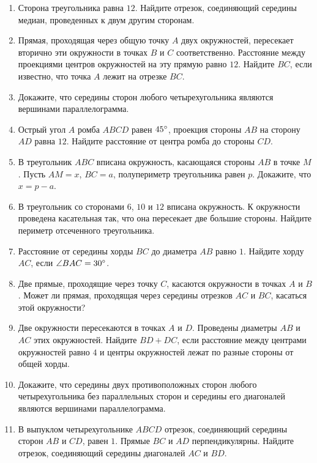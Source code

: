 \documentclass[12pt, a4paper]{article}
\begin{document}
  
\cfoot{}
\begin{enumerate}
	\item Сторона треугольника равна $12$. Найдите отрезок, соединяющий середины медиан, проведенных к двум другим сторонам.
	\item Прямая, проходящая через общую точку $A$ двух окружностей, пересекает вторично эти окружности в точках $B$ и $C$ соответственно. Расстояние между проекциями центров окружностей на эту прямую равно $12$. Найдите $BC$, если известно, что точка $A$ лежит на отрезке $BC$.
	\item Докажите, что середины сторон любого четырехугольника являются вершинами параллелограмма.
	\item Острый угол $A$ ромба $ABCD$ равен $45\degree$, проекция стороны $AB$ на сторону $AD$ равна $12$. Найдите расстояние от центра ромба до стороны $CD$.
	\item В треугольник $ABC$ вписана окружность, касающаяся стороны $AB$ в точке $M$. Пусть $AM = x$, $BC = a$, полупериметр треугольника равен $p$. Докажите, что $x=p-a$.
	\item В треугольник со сторонами $6$, $10$ и $12$ вписана окружность. К окружности проведена касательная так, что она пересекает две большие стороны. Найдите периметр отсеченного треугольника.
	\item Расстояние от середины хорды $BC$ до диаметра $AB$ равно $1$. Найдите хорду $AC$, если $\angle BAC = 30 \degree$.
	\item Две прямые, проходящие через точку $C$, касаются окружности в точках $A$ и $B$. Может ли прямая, проходящая через середины отрезков $AC$ и $BC$, касаться этой окружности?
	\item Две окружности пересекаются в точках $A$ и $D$. Проведены диаметры $AB$ и $AC$ этих окружностей. Найдите $BD+DC$, если расстояние между центрами окружностей равно $4$ и центры окружностей лежат по разные стороны от общей хорды.
	\item Докажите, что середины двух противоположных сторон любого четырехугольника без параллельных сторон и середины его диагоналей являются вершинами параллелограмма.
	\item В выпуклом четырехугольнике $ABCD$ отрезок, соединяющий середины сторон $AB$ и $CD$, равен $1$. Прямые $BC$ и $AD$ перпендикулярны. Найдите отрезок, соединяющий середины диагоналей $AC$ и $BD$.
\end{enumerate}
\end{document}
